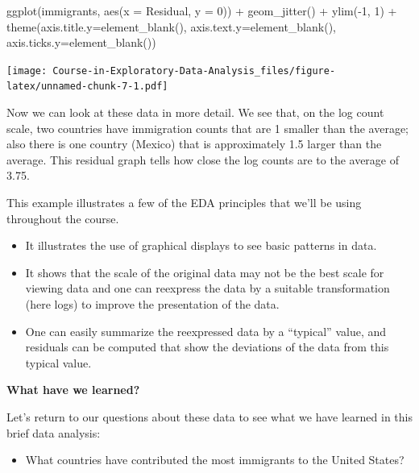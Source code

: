 \documentclass[
]{book}
\newenvironment{Shaded}{\begin{snugshade}}{\end{snugshade}}
\newcommand{\AttributeTok}[1]{\textcolor[rgb]{0.77,0.63,0.00}{#1}}
\newcommand{\DecValTok}[1]{\textcolor[rgb]{0.00,0.00,0.81}{#1}}
\newcommand{\FunctionTok}[1]{\textcolor[rgb]{0.00,0.00,0.00}{#1}}
\newcommand{\NormalTok}[1]{#1}
\newcommand{\SpecialCharTok}[1]{\textcolor[rgb]{0.00,0.00,0.00}{#1}}
\providecommand{\tightlist}{%
  \setlength{\itemsep}{0pt}\setlength{\parskip}{0pt}}
\begin{document}
\begin{Shaded}
\begin{Highlighting}[]
\FunctionTok{ggplot}\NormalTok{(immigrants,}
       \FunctionTok{aes}\NormalTok{(}\AttributeTok{x =}\NormalTok{ Residual, }\AttributeTok{y =} \DecValTok{0}\NormalTok{)) }\SpecialCharTok{+}
     \FunctionTok{geom\_jitter}\NormalTok{() }\SpecialCharTok{+} \FunctionTok{ylim}\NormalTok{(}\SpecialCharTok{{-}}\DecValTok{1}\NormalTok{, }\DecValTok{1}\NormalTok{) }\SpecialCharTok{+}
     \FunctionTok{theme}\NormalTok{(}\AttributeTok{axis.title.y=}\FunctionTok{element\_blank}\NormalTok{(),}
     \AttributeTok{axis.text.y=}\FunctionTok{element\_blank}\NormalTok{(),}
     \AttributeTok{axis.ticks.y=}\FunctionTok{element\_blank}\NormalTok{())}
\end{Highlighting}
\end{Shaded}

\texttt{[image: Course-in-Exploratory-Data-Analysis\_files/figure-latex/unnamed-chunk-7-1.pdf]}

Now we can look at these data in more detail. We see that, on the log count scale, two countries have immigration counts that are 1 smaller than the average; also there is one country (Mexico) that is approximately 1.5 larger than the average. This residual graph tells how close the log counts are to the average of 3.75.

This example illustrates a few of the EDA principles that we'll be using throughout the course.

\begin{itemize}
\tightlist
\item
  It illustrates the use of graphical displays to see basic patterns in data.
\item
  It shows that the scale of the original data may not be the best scale for viewing data and one can reexpress the data by a suitable transformation (here logs) to improve the presentation of the data.
\item
  One can easily summarize the reexpressed data by a ``typical'' value, and residuals can be computed that show the deviations of the data from this typical value.
\end{itemize}

\textbf{What have we learned?}

Let's return to our questions about these data to see what we have learned in this brief data analysis:

\begin{itemize}
\tightlist
\item
  What countries have contributed the most immigrants to the United States?
\end{itemize}
\end{document}
